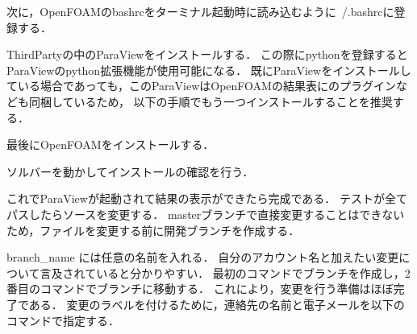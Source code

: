 \documentclass{ltjoc}
\begin{document}
次に，OpenFOAMのbashrcをターミナル起動時に読み込むように~/.bashrcに登録する．

\begin{shbox}
  \shuser{}
\end{shbox}

ThirdPartyの中のParaViewをインストールする．
この際にpythonを登録するとParaViewのpython拡張機能が使用可能になる．
既にParaViewをインストールしている場合であっても，このParaViewはOpenFOAMの結果表にのプラグインなども同梱しているため，
以下の手順でもう一つインストールすることを推奨する．

\begin{shbox}
  \shuser{}
\end{shbox}

最後にOpenFOAMをインストールする．

\begin{shbox}
  \shuser{}
\end{shbox}

ソルバーを動かしてインストールの確認を行う．

\begin{shbox}
  \shuser{}
\end{shbox}

これでParaViewが起動されて結果の表示ができたら完成である．
テストが全てパスしたらソースを変更する．
masterブランチで直接変更することはできないため，ファイルを変更する前に開発ブランチを作成する．

\begin{shbox}
  \shuser{}
\end{shbox}
\begin{shbox}
  \shuser{}
\end{shbox}

branch\_name には任意の名前を入れる．
自分のアカウント名と加えたい変更について言及されていると分かりやすい．
最初のコマンドでブランチを作成し，2番目のコマンドでブランチに移動する．
これにより，変更を行う準備はほぼ完了である．
変更のラベルを付けるために，連絡先の名前と電子メールを以下のコマンドで指定する．
\end{document}
